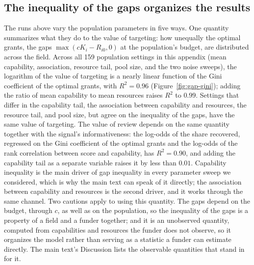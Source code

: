 

\subsection*{The inequality of the gaps organizes the results}
The runs above vary the population parameters in five ways. One quantity summarizes what they do to the value of targeting: how unequally the optimal grants, the gaps $\max(cK_i - R_{i0}, 0)$ at the population's budget, are distributed across the field. Across all 159 population settings in this appendix (mean capability, association, resource tail, pool size, and the two noise sweeps), the logarithm of the value of targeting is a nearly linear function of the Gini coefficient of the optimal grants, with $R^2 = 0.96$ (Figure~\ref{fig:gap-gini}); adding the ratio of mean capability to mean resources raises $R^2$ to $0.99$. Settings that differ in the capability tail, the association between capability and resources, the resource tail, and pool size, but agree on the inequality of the gaps, have the same value of targeting. The value of review depends on the same quantity together with the signal's informativeness: the log-odds of the share recovered, regressed on the Gini coefficient of the optimal grants and the log-odds of the rank correlation between score and capability, has $R^2 = 0.90$, and adding the capability tail as a separate variable raises it by less than $0.01$. Capability inequality is the main driver of gap inequality in every parameter sweep we considered, which is why the main text can speak of it directly; the association between capability and resources is the second driver, and it works through the same channel. Two cautions apply to using this quantity. The gaps depend on the budget, through $c$, as well as on the population, so the inequality of the gaps is a property of a field and a funder together; and it is an unobserved quantity, computed from capabilities and resources the funder does not observe, so it organizes the model rather than serving as a statistic a funder can estimate directly. The main text's Discussion lists the observable quantities that stand in for it.


